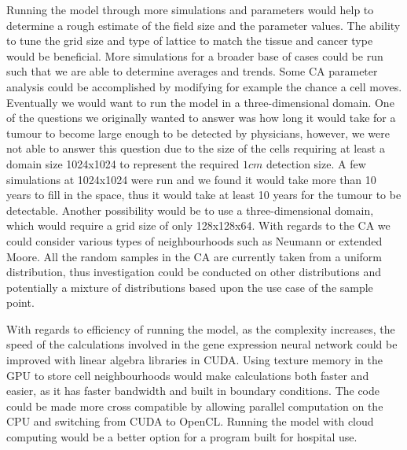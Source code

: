 \documentclass[\main/thesis.tex]{subfiles}
\begin{document}
Running the model through more simulations and parameters would help to determine a rough estimate of the field size and the parameter values. The ability to tune the grid size and type of lattice to match the tissue and cancer type would be beneficial. More simulations for a broader base of cases could be run such that we are able to determine averages and trends. Some CA parameter analysis could be accomplished by modifying for example the chance a cell moves. Eventually we would want to run the model in a three-dimensional domain. One of the questions we originally wanted to answer was how long it would take for a tumour to become large enough to be detected by physicians, however, we were not able to answer this question due to the size of the cells requiring at least a domain size 1024x1024 to represent the required $1 cm$ detection size. A few simulations at 1024x1024 were run and we found it would take more than 10 years to fill in the space, thus it would take at least 10 years for the tumour to be detectable. Another possibility would be to use a three-dimensional domain, which would require a grid size of only 128x128x64. With regards to the CA we could consider various types of neighbourhoods such as Neumann or extended Moore. All the random samples in the CA are currently taken from a uniform distribution, thus investigation could be conducted on other distributions and potentially a mixture of distributions based upon the use case of the sample point.

With regards to efficiency of running the model, as the complexity increases, the speed of the calculations involved in the gene expression neural network could be improved with linear algebra libraries in CUDA. Using texture memory in the GPU to store cell neighbourhoods would make calculations both faster and easier, as it has faster bandwidth and built in boundary conditions. The code could be made more cross compatible by allowing parallel computation on the CPU and switching from CUDA to OpenCL. Running the model with cloud computing would be a better option for a program built for hospital use.
\end{document}
